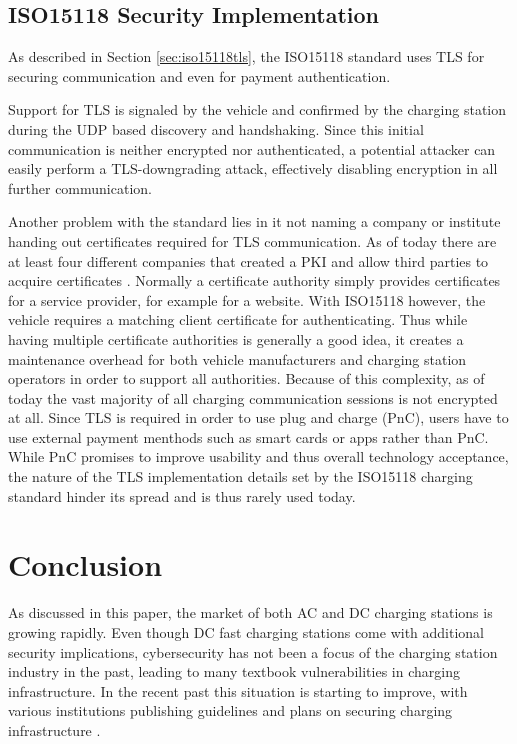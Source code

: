 \documentclass[conference,flushend]{iaria} %
\begin{document}
\subsection{ISO15118 Security Implementation}
As described in Section \ref{sec:iso15118tls}, the ISO15118 standard uses TLS for securing communication and even for payment authentication.

Support for TLS is signaled by the vehicle and confirmed by the charging station during the UDP based discovery and handshaking.
Since this initial communication is neither encrypted nor authenticated, a potential attacker can easily perform a TLS-downgrading attack, effectively disabling encryption in all further communication.

Another problem with the standard lies in it not naming a company or institute handing out certificates required for TLS communication.
As of today there are at least four different companies that created a PKI and allow third parties to acquire certificates \cite{charin_charin_nodate, hubject_download_nodate, nexusgroup_identities_nodate, irdeto_irdeto_nodate}.
Normally a certificate authority simply provides certificates for a service provider, for example for a website.
With ISO15118 however, the vehicle requires a matching client certificate for authenticating.
Thus while having multiple certificate authorities is generally a good idea, it creates a maintenance overhead for both vehicle manufacturers and charging station operators in order to support all authorities.
Because of this complexity, as of today the vast majority of all charging communication sessions is not encrypted at all.
Since TLS is required in order to use plug and charge (PnC), users have to use external payment menthods such as smart cards or apps rather than PnC.
While PnC promises to improve usability and thus overall technology acceptance, the nature of the TLS implementation details set by the ISO15118 charging standard hinder its spread and is thus rarely used today.



\section{Conclusion}
As discussed in this paper, the market of both AC and DC charging stations is growing rapidly.
Even though DC fast charging stations come with additional security implications, cybersecurity has not been a focus of the charging station industry in the past, leading to many textbook vulnerabilities in charging infrastructure.
In the recent past this situation is starting to improve, with various institutions publishing guidelines and plans on securing charging infrastructure \cite{mccarthy_cybersecurity_2023, encs_security_nodate}.
\end{document}
